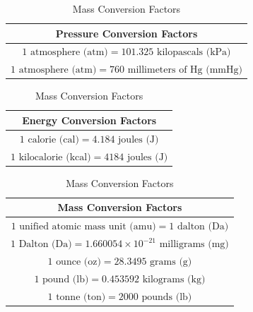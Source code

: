 \documentclass{article}
\begin{document}
\begin{table}
\begin{minipage}[t]{0.48\linewidth}
        \vspace{1cm}
        \begin{tabular}{|c|}
            \hline
            \textbf{Pressure Conversion Factors} \\
            \hline
            $1 \text{ atmosphere (atm)} = 101.325 \text{ kilopascals (kPa)}$ \\
            $1 \text{ atmosphere (atm)} = 760 \text{ millimeters of Hg (mmHg)}$ \\
            \hline
        \end{tabular}
        \caption{Pressure Conversion Factors}
        \label{tab:pressure_conversions}
        \vspace{1cm}
        \begin{tabular}{|c|}
            \hline
            \textbf{Energy Conversion Factors} \\
            \hline
            $1 \text{ calorie (cal)} = 4.184 \text{ joules (J)}$ \\
            $1 \text{ kilocalorie (kcal)} = 4184 \text{ joules (J)}$     \\
            \hline
        \end{tabular}
        \caption{Energy Conversion Factors}
        \label{tab:energy_conversions}
    \end{minipage}\hfill
    \begin{minipage}[t]{0.48\linewidth}
        \centering
        \begin{tabular}{|c|}
            \hline
            \textbf{Mass Conversion Factors} \\
            \hline
            $1 \text{ unified atomic mass unit (amu)} = 1 \text{ dalton (Da)}$ \\
            $1 \text{ Dalton (Da)} = 1.660054 \times 10^{-21} \text{ milligrams (mg)}$ \\
            $1 \text{ ounce (oz)} = 28.3495 \text{ grams (g)}$ \\
            $1 \text{ pound (lb)} = 0.453592 \text{ kilograms (kg)}$ \\
            $1 \text{ tonne (ton)} = 2000 \text{ pounds (lb)}$ \\
            \hline
        \end{tabular}
        \caption{Mass Conversion Factors}
        \label{tab:mass_conversions}
        \vspace{1cm}

\end{minipage}
\end{table}
\end{document}
